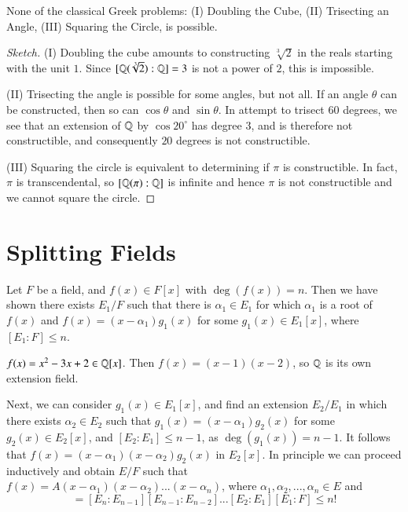 \begin{theorem}
    None of the classical Greek problems: (I) Doubling the Cube, (II) Trisecting an Angle, (III) Squaring the Circle, is possible.
\end{theorem}
\begin{proof}[Sketch]
    (I) Doubling the cube amounts to constructing $\sqrt[3]{2}$ in the reals starting with the unit $1$. Since $[\mathbb Q(\sqrt[3]{2}):\mathbb Q] = 3$ is not a power of $2$, this is impossible.

    (II) Trisecting the angle is possible for some angles, but not all. If an angle $\theta$ can be constructed, then so can $\cos\theta$ and $\sin\theta$. In attempt to trisect $60$ degrees, we see that an extension of $\mathbb Q$ by $\cos20^{\circ}$ has degree $3$, and is therefore not constructible, and consequently $20$ degrees is not constructible.

    (III) Squaring the circle is equivalent to determining if $\pi$ is constructible. In fact, $\pi$ is transcendental, so $[\mathbb Q(\pi):\mathbb Q]$ is infinite and hence $\pi$ is not constructible and we cannot square the circle.
\end{proof}


\section{ Splitting Fields}

Let $F$ be a field, and $f(x) \in F[x]$ with $\deg(f(x)) = n$. Then we have shown there exists $E_1/F$ such that there is $\alpha_1 \in E_1$ for which $\alpha_1$ is a root of $f(x)$ and $f(x) = (x-\alpha_1)g_1(x)$ for some $g_1(x) \in E_1[x]$, where $[E_1:F] \leq n$.

\begin{example}
    $f(x) = x^2-3x+2 \in \mathbb Q[x]$. Then $f(x) = (x-1)(x-2)$, so $\mathbb Q$ is its own extension field.
\end{example}


Next, we can consider $g_1(x) \in E_1[x]$, and find an extension $E_2/E_1$ in which there exists $\alpha_2 \in E_2$ such that $g_1(x) = (x-\alpha_1)g_2(x)$ for some $g_2(x) \in E_2[x]$, and $[E_2:E_1] \leq n-1$, as $\deg(g_1(x)) = n-1$. It follows that $f(x) = (x-\alpha_1)(x-\alpha_2)g_2(x)$ in $E_2[x]$. In principle we can proceed inductively and obtain $E/F$ such that $f(x) = A(x-\alpha_1)(x-\alpha_2)...(x-\alpha_n)$, where $\alpha_1,\alpha_2,...,\alpha_n \in E$ and \begin{equation*}
    [E:F] = [E_n:E_{n-1}][E_{n-1}:E_{n-2}]...[E_2:E_1][E_1:F] \leq n!
\end{equation*}


